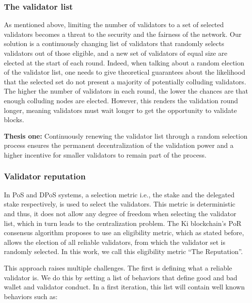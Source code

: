 \subsubsection{The validator list}
\label{sec:kiblockchainvalidatorlist}
As mentioned above, limiting the number of validators to a set of selected validators becomes a threat to the security and the fairness of the network. Our solution is a continuously changing list of validators that randomly selects validators out of those eligible, and a new set of validators of equal size are elected at the start of each round. Indeed, when talking about a random election of the validator list, one needs to give theoretical guarantees about the likelihood that the selected set do not present a majority of potentially colluding validators. The higher the number of validators in each round, the lower the chances are that enough colluding nodes are elected. However, this renders the validation round longer, meaning validators must wait longer to get the opportunity to validate blocks. 
					
\textbf{Thesis one:} Continuously renewing the validator list through a random selection process ensures the permanent decentralization of the validation power and a higher incentive for smaller validators to remain part of the process.

\subsubsection{Validator reputation}
\label{sec:kiblockchainvalidatorrep}
In PoS and DPoS systems, a selection metric i.e., the stake and the delegated stake respectively, is used to select the validators. This metric is deterministic and thus, it does not allow any degree of freedom when selecting the validator list, which in turn leads to the centralization problem. The Ki blockchain's PoR consensus algorithm proposes to use an eligibility metric, which as stated before, allows the election of all reliable validators, from which the validator set is randomly selected. In this work, we call this eligibility metric “The Reputation”. 

This approach raises multiple challenges. The first is defining what a reliable validator is. We do this by setting a  list of behaviors that define good and bad wallet and validator conduct. In a first iteration, this list will contain well known behaviors such as: 

